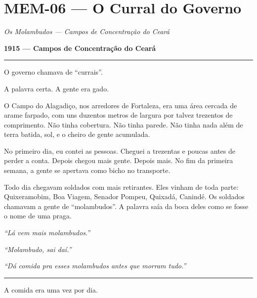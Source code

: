 \section*{\textbf{MEM-06} --- O Curral do Governo}

\noindent \textit{Os Molambudos --- Campos de Concentração do Ceará}

\noindent \textbf{1915 --- Campos de Concentração do Ceará}

\vspace{0.5em}\noindent\rule{\textwidth}{0.5pt}\vspace{0.5em}

\noindent O governo chamava de \textquotedblleft{}currais\textquotedblright{}.

\noindent A palavra certa. A gente era gado.

\noindent O Campo do Alagadiço, nos arredores de Fortaleza, era uma área cercada de arame farpado, com uns duzentos metros de largura por talvez trezentos de comprimento. Não tinha cobertura. Não tinha parede. Não tinha nada além de terra batida, sol, e o cheiro de gente acumulada.

\noindent No primeiro dia, eu contei as pessoas. Cheguei a trezentas e poucas antes de perder a conta. Depois chegou mais gente. Depois mais. No fim da primeira semana, a gente se apertava como bicho no transporte.

\noindent Todo dia chegavam soldados com mais retirantes. Eles vinham de toda parte: Quixeramobim, Boa Viagem, Senador Pompeu, Quixadá, Canindé. Os soldados chamavam a gente de \textquotedblleft{}molambudos\textquotedblright{}. A palavra saía da boca deles como se fosse o nome de uma praga.

\noindent \textit{\textquotedblleft{}Lá vem mais molambudos.\textquotedblright{}}

\noindent \textit{\textquotedblleft{}Molambudo, sai daí.\textquotedblright{}}

\noindent \textit{\textquotedblleft{}Dá comida pra esses molambudos antes que morram tudo.\textquotedblright{}}

\vspace{0.5em}\noindent\rule{\textwidth}{0.5pt}\vspace{0.5em}

\noindent A comida era uma vez por dia.

